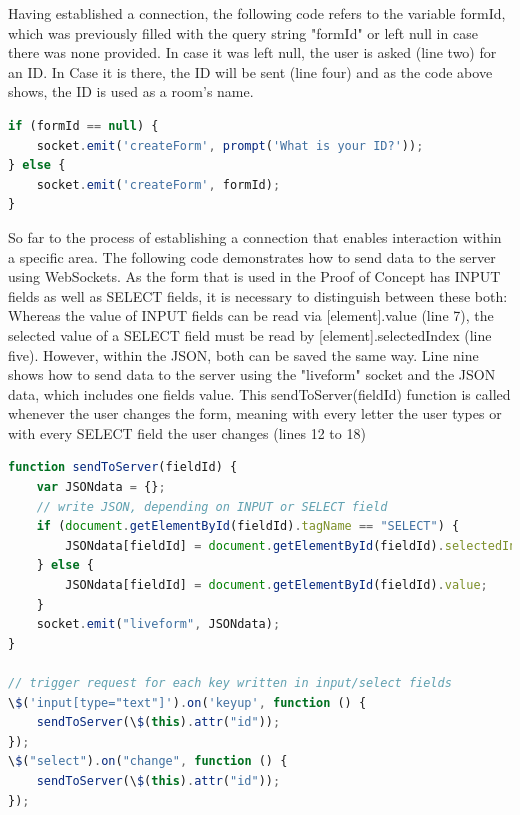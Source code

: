 Having established a connection, the following code refers to the variable formId, which was previously filled with the query string "formId" or left null in case there was none provided. In case it was left null, the user is asked (line two) for an ID. In Case it is there, the ID will be sent (line four) and as the code above shows, the ID is used as a room's name.

\begin{lstlisting}[language=javascript,caption={Joining a specific area – "room"}]
if (formId == null) {
	socket.emit('createForm', prompt('What is your ID?'));
} else {
	socket.emit('createForm', formId);
}
\end{lstlisting}

So far to the process of establishing a connection that enables interaction within a specific area. The following code demonstrates how to send data to the server using WebSockets. As the form that is used in the Proof of Concept has INPUT fields as well as SELECT fields, it is necessary to distinguish between these both: Whereas the value of INPUT fields can be read via [element].value (line 7), the selected value of a SELECT field must be read by [element].selectedIndex (line five). However, within the JSON, both can be saved the same way. Line nine shows how to send data to the server using the "liveform" socket and the JSON data, which includes one fields value. This sendToServer(fieldId) function is called whenever the user changes the form, meaning with every letter the user types or with every SELECT field the user changes (lines 12 to 18)

\begin{lstlisting}[language=javascript,caption={Sending data to the server}]
function sendToServer(fieldId) {
    var JSONdata = {};
    // write JSON, depending on INPUT or SELECT field
    if (document.getElementById(fieldId).tagName == "SELECT") {
        JSONdata[fieldId] = document.getElementById(fieldId).selectedIndex;
    } else {
        JSONdata[fieldId] = document.getElementById(fieldId).value;
    }
    socket.emit("liveform", JSONdata);
}

// trigger request for each key written in input/select fields
\$('input[type="text"]').on('keyup', function () {
    sendToServer(\$(this).attr("id"));
});
\$("select").on("change", function () {
    sendToServer(\$(this).attr("id"));
});
\end{lstlisting}

